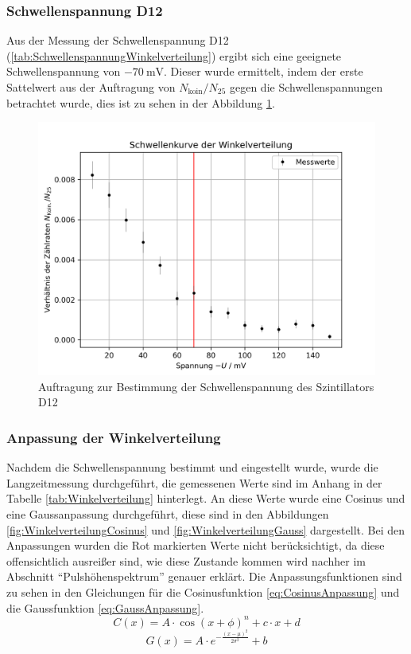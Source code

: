 \documentclass{article}
\begin{document}
\subsubsection*{Schwellenspannung D12}
Aus der Messung der Schwellenspannung D12 (\ref{tab:SchwellenspannungWinkelverteilung}) ergibt sich eine geeignete Schwellenspannung von $\SI{-70}{\milli\volt}$.
Dieser wurde ermittelt, indem der erste Sattelwert aus der Auftragung von $N_\text{koin}/N_{25}$ gegen die Schwellenspannungen betrachtet wurde, 
dies ist zu sehen in der Abbildung \ref{fig:SchwellenspannungWinkelverteilung}.
\begin{figure}[H]
    \centering
    \includegraphics[width=1\textwidth]{figures/Schwellenspannung_Winkelverteilung.png}
    \caption{Auftragung zur Bestimmung der Schwellenspannung des Szintillators D12}
    \label{fig:SchwellenspannungWinkelverteilung}
\end{figure}
\subsubsection*{Anpassung der Winkelverteilung}
Nachdem die Schwellenspannung bestimmt und eingestellt wurde, wurde die Langzeitmessung durchgeführt, die gemessenen Werte sind im Anhang in der Tabelle \ref{tab:Winkelverteilung} hinterlegt.
An diese Werte wurde eine Cosinus und eine Gaussanpassung durchgeführt, diese sind in den Abbildungen \ref{fig:WinkelverteilungCosinus} und \ref{fig:WinkelverteilungGauss} dargestellt.
Bei den Anpassungen wurden die Rot markierten Werte nicht berücksichtigt, da diese offensichtlich ausreißer sind, wie diese Zustande kommen wird nachher im Abschnitt \enquote{Pulshöhenspektrum} genauer erklärt.
Die Anpassungsfunktionen sind zu sehen in den Gleichungen für die Cosinusfunktion \ref{eq:CosinusAnpassung} und die Gaussfunktion \ref{eq:GaussAnpassung}.
\begin{displaymath}
   C(x) = A \cdot \cos( x + \phi )^n + c \cdot x + d
\label{eq:CosinusAnpassung}
\end{displaymath}
\begin{displaymath}
    G(x) = A \cdot e^{-\frac{(x - \mu)^2}{2\sigma^2}} + b
\label{eq:GaussAnpassung}
\end{displaymath}
\end{document}
